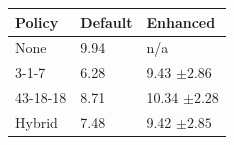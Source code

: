 \begin{figure}[h]

\begin{subtable}{.30\linewidth}\centering
\begin{tabular}{|l|ll|}
\hline
\textbf{Policy} & \textbf{Default} & \textbf{Enhanced} \\ \hline
None            &             9.94                   &  n/a                                    \\
3-1-7           &             6.28                   &      9.43 $\pm 2.86$                               \\
43-18-18  &       8.71                         &  10.34      $\pm 2.28$               \\
Hybrid          &             7.48                   &         9.42   $\pm 2.85$                     \\ \hline


\end{tabular}
\end{subtable}
\end{figure}
